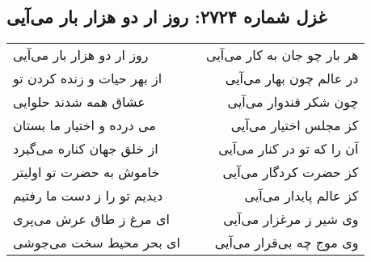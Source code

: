 \begin{center}
\section*{غزل شماره ۲۷۲۴: روز ار دو هزار بار می‌آیی}
\label{sec:2724}
\begin{longtable}{l p{0.5cm} r}
روز ار دو هزار بار می‌آیی
&&
هر بار چو جان به کار می‌آیی
\\
از بهر حیات و زنده کردن تو
&&
در عالم چون بهار می‌آیی
\\
عشاق همه شدند حلوایی
&&
چون شکر قندوار می‌آیی
\\
می درده و اختیار ما بستان
&&
کز مجلس اختیار می‌آیی
\\
از خلق جهان کناره می‌گیرد
&&
آن را که تو در کنار می‌آیی
\\
خاموش به حضرت تو اولیتر
&&
کز حضرت کردگار می‌آیی
\\
دیدیم تو را ز دست ما رفتیم
&&
کز عالم پایدار می‌آیی
\\
ای مرغ ز طاق عرش می‌پری
&&
وی شیر ز مرغزار می‌آیی
\\
ای بحر محیط سخت می‌جوشی
&&
وی موج چه بی‌قرار می‌آیی
\\
\end{longtable}
\end{center}
